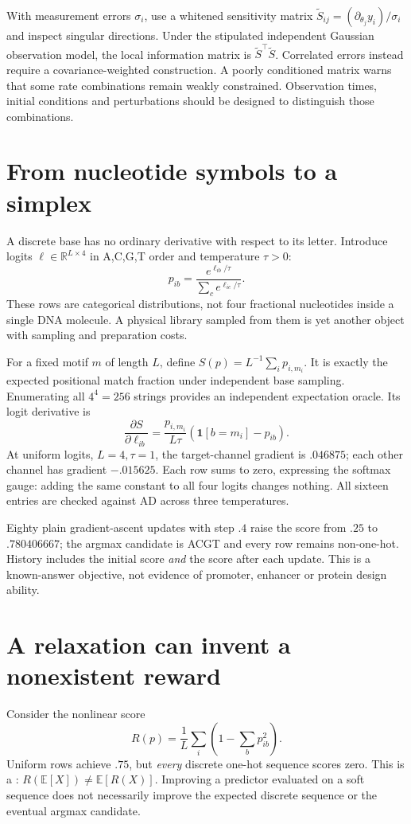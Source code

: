 With measurement errors $\sigma_i$, use a whitened sensitivity matrix
$\tilde S_{ij}=(\partial_{\theta_j}y_i)/\sigma_i$ and inspect singular directions.
Under the stipulated independent Gaussian observation model, the local
information matrix is $\tilde S^\top\tilde S$. Correlated errors instead require
a covariance-weighted construction. A poorly conditioned matrix warns that
some rate combinations remain weakly constrained. Observation times, initial
conditions and perturbations should be designed to distinguish those combinations.

\section{From nucleotide symbols to a simplex}
A discrete base has no ordinary derivative with respect to its letter.
Introduce logits $\ell\in\mathbb R^{L\times4}$ in A,C,G,T order and temperature
$\tau>0$:
\[
 p_{ib}=\frac{e^{\ell_{ib}/\tau}}{\sum_c e^{\ell_{ic}/\tau}}.
\]
These rows are categorical distributions, not four fractional nucleotides
inside a single DNA molecule. A physical library sampled from them is yet another
object with sampling and preparation costs.

For a fixed motif $m$ of length $L$, define
$S(p)=L^{-1}\sum_i p_{i,m_i}$. It is exactly the expected positional match fraction
under independent base sampling. Enumerating all $4^4=256$ strings provides an
independent expectation oracle. Its logit derivative is
\[
 \frac{\partial S}{\partial\ell_{ib}}
 =\frac{p_{i,m_i}}{L\tau}\left(\mathbf1[b=m_i]-p_{ib}\right).
\]
At uniform logits, $L=4,\tau=1$, the target-channel gradient is $.046875$;
each other channel has gradient $-.015625$. Each row sums to zero, expressing
the softmax gauge: adding the same constant to all four logits changes nothing.
All sixteen entries are checked against AD across three temperatures.

Eighty plain gradient-ascent updates with step $.4$ raise the score from $.25$
to $.780406667$; the argmax candidate is ACGT and every row remains non-one-hot.
History includes the initial score \emph{and} the score after each update.
This is a known-answer objective, not evidence of promoter, enhancer or protein
design ability.

\section{A relaxation can invent a nonexistent reward}
Consider the nonlinear score
\[
 R(p)=\frac1L\sum_i\left(1-\sum_b p_{ib}^2\right).
\]
Uniform rows achieve $.75$, but \emph{every} discrete one-hot sequence scores zero.
This is a : $R(\mathbb E[X])\neq\mathbb E[R(X)]$. Improving a predictor evaluated
on a soft sequence does not necessarily improve the expected discrete sequence
or the eventual argmax candidate.

